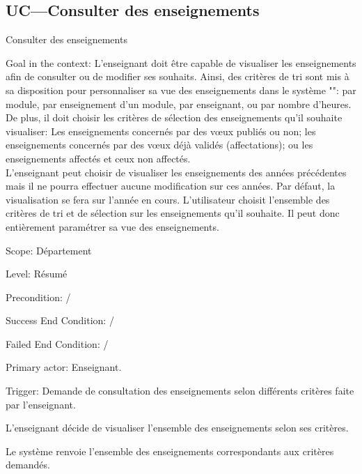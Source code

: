 \begin{ocl}
 \subsection{UC---Consulter des enseignements}

\begin{usecase}{Consulter des enseignements}
\label{usecase:consulter}
\begin{information}
	\item[Goal in the context:]  L'enseignant doit être capable de visualiser les enseignements afin de consulter ou de modifier ses souhaits.
 Ainsi, des critères de tri sont mis à sa disposition pour personnaliser sa vue des enseignements dans le système "\projet": par module, par enseignement d'un module, par enseignant, ou par nombre d'heures.\\
 De plus, il doit choisir les critères de sélection des enseignements qu'il souhaite visualiser:
Les enseignements concernés par des vœux publiés ou non; les enseignements concernés par des vœux déjà validés (affectations);
ou les enseignements affectés et ceux non affectés.\\
 L'enseignant peut choisir de visualiser les enseignements des années précédentes mais il ne pourra effectuer aucune modification sur ces années. Par défaut, la visualisation se fera sur l'année en cours.
 L'utilisateur choisit l'ensemble des critères de tri et de sélection sur les enseignements qu'il souhaite. Il peut donc entièrement paramétrer sa vue des enseignements.
	\item[Scope:] Département
	\item[Level:] Résumé
	\item[Precondition:]/
	\item[Success End Condition:]/
	\item[Failed End Condition:]/
	\item[Primary actor:] Enseignant.
	\item[Trigger:] Demande de consultation des enseignements selon différents critères faite par l'enseignant.
\end{information}

\begin{scenario}
	\item L'enseignant décide de visualiser l'ensemble des enseignements selon ses critères.
	\item Le système renvoie l'ensemble des enseignements correspondants aux critères demandés.
\end{scenario}


\end{usecase}
\end{ocl}
